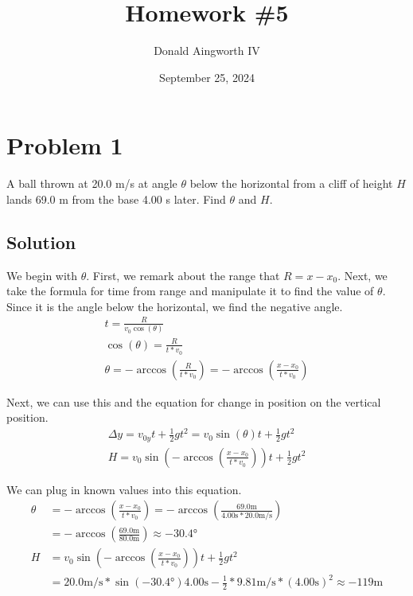 \documentclass[12pt]{article}
\title{Homework \#5}
\author{Donald Aingworth IV}
\date{September 25, 2024}
\begin{document}

\maketitle

\section*{Problem 1}
A ball thrown at 20.0 m/s at angle $\theta$ below the horizontal from a cliff of height $H$ lands 69.0 m from the base 4.00 s later. Find $\theta$ and $H$.

\subsection*{Solution}
We begin with $\theta$. First, we remark about the range that $R = x - x_0$. Next, we take the formula for time from range and manipulate it to find the value of $\theta$. Since it is the angle below the horizontal, we find the negative angle.
\begin{eqnarray}
    t = \frac{R}{v_0 \cos(\theta)}\\
    \cos(\theta) = \frac{R}{t*v_0}\\
    \theta = -\arccos\left(\frac{R}{t*v_0}\right) = -\arccos\left(\frac{x - x_0}{t*v_0}\right)
\end{eqnarray}

Next, we can use this and the equation for change in position on the vertical position.
\begin{eqnarray}
    \Delta y = v_{0y}t + \frac{1}{2} gt^2 = v_0 \sin\left(\theta \right) t + \frac{1}{2} gt^2 \\
    H = v_0 \sin\left( -\arccos\left(\frac{x - x_0}{t*v_0} \right) \right) t + \frac{1}{2} gt^2
\end{eqnarray}

We can plug in known values into this equation.
\begin{align}
    \theta &= -\arccos\left(\frac{x - x_0}{t*v_0}\right) 
            = -\arccos\left(\frac{69.0\unit{\meter}}{4.00\unit{\second} * 20.0\unit{\meter/\second}}\right) \\
           &= -\arccos\left(\frac{69.0\unit{\meter}}{80.0\unit{\meter}}\right) 
            \approx \boxed{-30.4\unit{\degree}}\\
    H &= v_0 \sin\left( -\arccos\left(\frac{x - x_0}{t*v_0} \right) \right) t + \frac{1}{2} gt^2\\
      &= 20.0\unit{\meter/\second} * \sin\left( -30.4\unit{\degree} \right) 4.00\unit{\second} - \frac{1}{2} * 9.81\unit{\meter/\second} * (4.00\unit{\second})^2 \approx -119 \unit{\meter}
\end{align}
\end{document}
